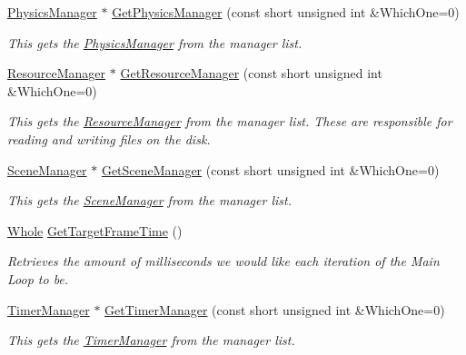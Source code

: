 \begin{DoxyCompactItemize}
\hyperlink{classMezzanine_1_1PhysicsManager}{PhysicsManager} $\ast$ \hyperlink{classMezzanine_1_1World_a77965d0aa164af69fb0e096841d4c422}{GetPhysicsManager} (const short unsigned int \&WhichOne=0)
\begin{DoxyCompactList}\small\item\em This gets the \hyperlink{classMezzanine_1_1PhysicsManager}{PhysicsManager} from the manager list. \item\end{DoxyCompactList}\item 
\hyperlink{classMezzanine_1_1ResourceManager}{ResourceManager} $\ast$ \hyperlink{classMezzanine_1_1World_ab758bcb0cc819a254ba8590cf999a2ea}{GetResourceManager} (const short unsigned int \&WhichOne=0)
\begin{DoxyCompactList}\small\item\em This gets the \hyperlink{classMezzanine_1_1ResourceManager}{ResourceManager} from the manager list. These are responsible for reading and writing files on the disk. \item\end{DoxyCompactList}\item 
\hyperlink{classMezzanine_1_1SceneManager}{SceneManager} $\ast$ \hyperlink{classMezzanine_1_1World_a33f082a0683317ff7dccbf573da6c63e}{GetSceneManager} (const short unsigned int \&WhichOne=0)
\begin{DoxyCompactList}\small\item\em This gets the \hyperlink{classMezzanine_1_1SceneManager}{SceneManager} from the manager list. \item\end{DoxyCompactList}\item 
\hyperlink{namespaceMezzanine_adcbb6ce6d1eb4379d109e51171e2e493}{Whole} \hyperlink{classMezzanine_1_1World_a6ca3b0c1ae38545df40bea731f6ba9cf}{GetTargetFrameTime} ()
\begin{DoxyCompactList}\small\item\em Retrieves the amount of milliseconds we would like each iteration of the Main Loop to be. \item\end{DoxyCompactList}\item 
\hyperlink{classMezzanine_1_1TimerManager}{TimerManager} $\ast$ \hyperlink{classMezzanine_1_1World_a3916b6823fa3978561ba36d0b7bf7ad0}{GetTimerManager} (const short unsigned int \&WhichOne=0)
\begin{DoxyCompactList}\small\item\em This gets the \hyperlink{classMezzanine_1_1TimerManager}{TimerManager} from the manager list. \item\end{DoxyCompactList}\item 

\end{DoxyCompactItemize}
